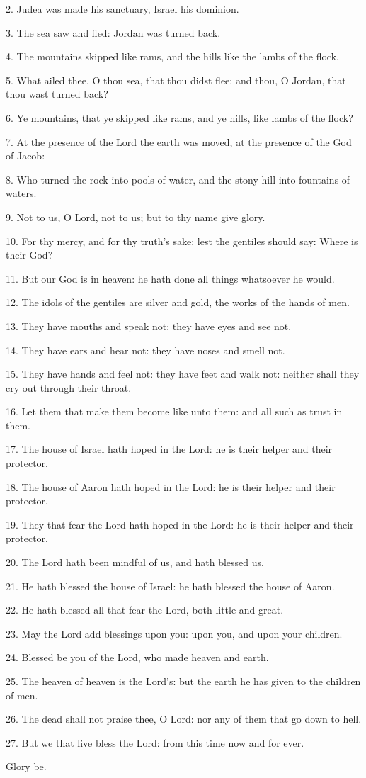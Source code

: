 
2. Judea was made his sanctuary, Israel his dominion.

3. The sea saw and fled: Jordan was turned back.

4. The mountains skipped like rams, and the hills like the lambs of the flock.

5. What ailed thee, O thou sea, that thou didst flee: and thou, O Jordan, that thou wast turned back?

6. Ye mountains, that ye skipped like rams, and ye hills, like lambs of the flock?

7. At the presence of the Lord the earth was moved, at the presence of the God of Jacob:

8. Who turned the rock into pools of water, and the stony hill into fountains of waters.

9. Not to us, O Lord, not to us; but to thy name give glory.

10. For thy mercy, and for thy truth's sake: lest the gentiles should say: Where is their God?

11. But our God is in heaven: he hath done all things whatsoever he would.

12. The idols of the gentiles are silver and gold, the works of the hands of men.

13. They have mouths and speak not: they have eyes and see not.

14. They have ears and hear not: they have noses and smell not.

15. They have hands and feel not: they have feet and walk not: neither shall they cry out through their throat.

16. Let them that make them become like unto them: and all such as trust in them.

17. The house of Israel hath hoped in the Lord: he is their helper and their protector.

18. The house of Aaron hath hoped in the Lord: he is their helper and their protector.

19. They that fear the Lord hath hoped in the Lord: he is their helper and their protector.

20. The Lord hath been mindful of us, and hath blessed us.

21. He hath blessed the house of Israel: he hath blessed the house of Aaron.

22. He hath blessed all that fear the Lord, both little and great.

23. May the Lord add blessings upon you: upon you, and upon your children.

24. Blessed be you of the Lord, who made heaven and earth.

25. The heaven of heaven is the Lord's: but the earth he has given to the children of men.

26. The dead shall not praise thee, O Lord: nor any of them that go down to hell.

27. But we that live bless the Lord: from this time now and for ever.

Glory be.